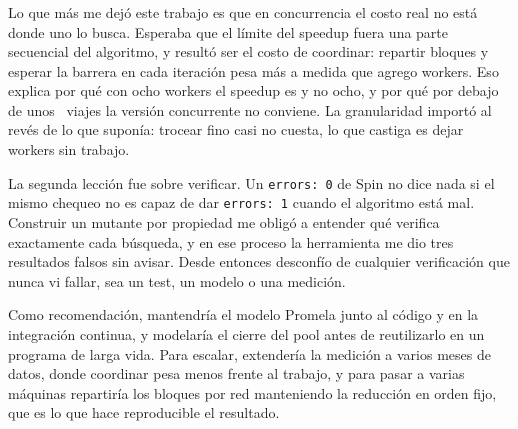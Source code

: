 \subsubsection*{\nombreRody}

Lo que más me dejó este trabajo es que en concurrencia el costo real no está donde uno lo busca.
Esperaba que el límite del speedup fuera una parte secuencial del algoritmo, y resultó ser el costo
de coordinar: repartir bloques y esperar la barrera en cada iteración pesa más a medida que agrego
workers. Eso explica por qué con ocho workers el speedup es  y no ocho, y por
qué por debajo de unos ~viajes la versión concurrente no conviene. La
granularidad importó al revés de lo que suponía: trocear fino casi no cuesta, lo que castiga es
dejar workers sin trabajo.

La segunda lección fue sobre verificar. Un \texttt{errors: 0} de Spin no dice nada si el mismo
chequeo no es capaz de dar \texttt{errors: 1} cuando el algoritmo está mal. Construir un mutante
por propiedad me obligó a entender qué verifica exactamente cada búsqueda, y en ese proceso la
herramienta me dio tres resultados falsos sin avisar. Desde entonces desconfío de cualquier
verificación que nunca vi fallar, sea un test, un modelo o una medición.

Como recomendación, mantendría el modelo Promela junto al código y en la integración continua, y
modelaría el cierre del pool antes de reutilizarlo en un programa de larga vida. Para escalar,
extendería la medición a varios meses de datos, donde coordinar pesa menos frente al trabajo, y
para pasar a varias máquinas repartiría los bloques por red manteniendo la reducción en orden fijo,
que es lo que hace reproducible el resultado.
